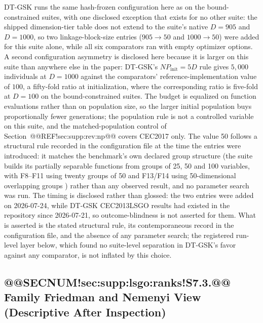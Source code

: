 \documentclass[10pt,a4paper]{article}
\newcommand{\dtgsk}{DT-GSK}
\begin{document}
\dtgsk{} runs the same hash-frozen configuration here as on the
bound-constrained suites, with one disclosed exception that exists for no
other suite: the shipped dimension-tier table does not extend to the
suite's native $D = 905$ and $D = 1000$, so two linkage-block-size entries
($905 \rightarrow 50$ and $1000 \rightarrow 50$) were added for this
suite alone, while all six comparators ran with empty optimizer options.
A second configuration asymmetry is disclosed here because it is larger on
this suite than anywhere else in the paper: \dtgsk{}'s
$NP_{\mathrm{init}} = 5D$ rule gives $5{,}000$ individuals at $D = 1000$
against the comparators' reference-implementation value of $100$, a
fifty-fold ratio at initialization, where the corresponding ratio is
five-fold at $D = 100$ on the bound-constrained suites. The budget is
equalized on function evaluations rather than on population size, so the
larger initial population buys proportionally fewer generations; the
population rule is not a controlled variable on this suite, and the
matched-population control of Section~@@REF!sec:supp:rev:np@@ covers
CEC2017 only.
The value 50 follows a structural rule recorded in the configuration file
at the time the entries were introduced: it matches the benchmark's own
declared group structure (the suite builds its partially separable
functions from groups of 25, 50 and 100 variables, with F8--F11 using
twenty groups of 50 and F13/F14 using 50-dimensional overlapping groups
) rather than any observed result, and no parameter search was run.
The timing is disclosed rather than glossed: the two entries were added on
2026-07-24, while \dtgsk{} CEC2013LSGO results had existed in the
repository since 2026-07-21, so outcome-blindness is not asserted for
them.  What is asserted is the stated structural rule, its contemporaneous
record in the configuration file, and the absence of any parameter
search; the registered run-level layer below, which found no suite-level
separation in \dtgsk{}'s favor against any comparator, is not inflated
by this choice.



\subsection{@@SECNUM!sec:supp:lsgo:ranks!S7.3.@@ Family Friedman and Nemenyi View (Descriptive After Inspection)}\label{sec:supp:lsgo:ranks}
\end{document}
